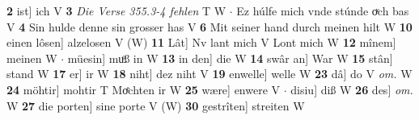 \documentclass[8pt,a4paper,notitlepage]{article}
\begin{document}
\begin{table}[ht]
\begin{minipage}[t]{0.5\linewidth}
\textbf{2} ist] ich V \textbf{3} \textit{Die Verse 355.3-4 fehlen} T W   $\cdot$ Ez húlfe mich vnde stúnde oͮch bas V \textbf{4} Sin hulde denne sin grosser has V \textbf{6} Mit seiner hand durch meinen hilt W \textbf{10} einen lôsen] alzelosen V (W) \textbf{11} Lât] Nv lant mich V Lont mich W \textbf{12} mînem] meinen W  $\cdot$ müesin] muͦß in W \textbf{13} in den] die W \textbf{14} swâr an] War W \textbf{15} stân] stand W \textbf{17} er] ir W \textbf{18} niht] dez niht V \textbf{19} enwelle] welle W \textbf{23} dâ] do V \textit{om.} W \textbf{24} möhtir] mohtir T Moͤchten ir W \textbf{25} wære] enwere V  $\cdot$ disiu] diß W \textbf{26} des] \textit{om.} W \textbf{27} die porten] sine porte V (W) \textbf{30} gestrîten] streiten W \newline
\end{minipage}
\end{table}
\end{document}
